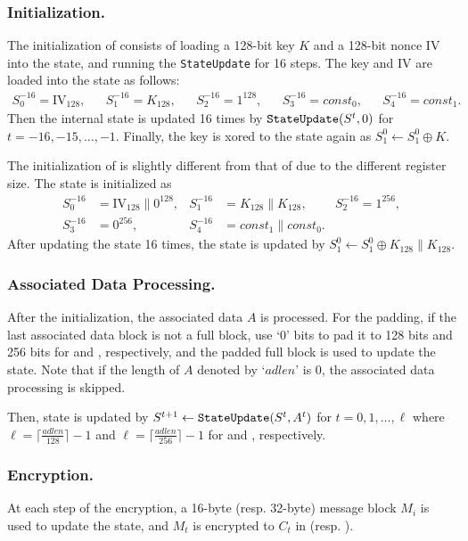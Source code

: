 \subsubsection{Initialization.}
The initialization of  consists of loading a 128-bit key $K$ and a 128-bit nonce IV into the state, and running the {\tt StateUpdate} for 16 steps. The key and IV are loaded into the state as follows:
\begin{align*}
S^{-16}_0 = \textrm{IV}_{128}, &&
S^{-16}_1 = K_{128}, &&
S^{-16}_2 = 1^{128}, &&
S^{-16}_3 = const_0, &&
S^{-16}_4 = const_1.
\end{align*}
Then the internal state is updated 16 times by  ${\tt StateUpdate}(S^t,0)$ for $t=-16,-15,\ldots,-1$. Finally, the key is xored to the state again as $S^0_1 \leftarrow S^0_1 \oplus K$.

The initialization of  is slightly different from that of  due to the different register size. The state is initialized as
\begin{align*}
S^{-16}_0 &= \textrm{IV}_{128} \| 0^{128}, &
S^{-16}_1 &= K_{128}\|K_{128}, &
S^{-16}_2 = 1^{256}, \\
S^{-16}_3 &= 0^{256}, &
S^{-16}_4 &= const_1\|const_0.
\end{align*}
After updating the state 16 times, the state is updated by $S^0_1 \leftarrow S^0_1 \oplus K_{128}\|K_{128}$.


\subsubsection{Associated Data Processing.}
After the initialization, the associated data $A$ is processed. For the padding, if the last associated data block is not a full block, use `0' bits to pad it to 128 bits and 256 bits for  and , respectively, and the padded full block is used to update the state. Note that if the length of $A$ denoted by `$adlen$' is 0, the associated data processing is skipped.

Then, state is updated by $S^{t+1} \leftarrow {\tt StateUpdate}(S^t, A^t)$ for $t=0,1,\ldots,\ell$ where $\ell = \lceil \frac{adlen}{128} \rceil -1$ and $\ell = \lceil \frac{adlen}{256} \rceil -1$ for  and , respectively.

\subsubsection{Encryption.}
At each step of the encryption, a 16-byte (resp. 32-byte) message block $M_i$ is used to update the state, and $M_t$ is encrypted to $C_t$ in  (resp. ).

